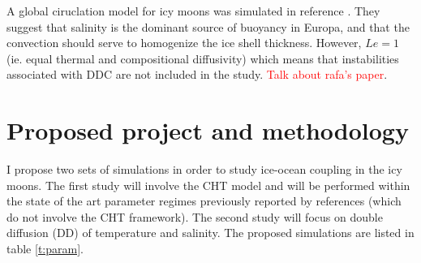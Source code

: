 \documentclass{article}
\begin{document}
A global ciruclation model for icy moons was simulated in reference \citep{yA21}. They suggest that salinity is the dominant source of buoyancy in Europa, and that the convection should serve to homogenize the ice shell thickness. However, $Le=1$ (ie. equal thermal and compositional diffusivity) which means that instabilities associated with DDC are not included in the study.
\textcolor{red}{Talk about rafa's paper}\citep{jF24}.
\section{Proposed project and methodology}
I propose two sets of simulations in order to study ice-ocean coupling in the icy moons. The first study will involve the CHT model and will be performed within the state of the art parameter regimes previously reported by references\citep{dL23,kS19} (which do not involve the CHT framework).
The second study will focus on double diffusion (DD) of temperature and salinity. The proposed simulations are listed in table \ref{t:param}.
\end{document}
